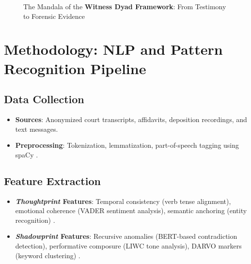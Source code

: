 \documentclass[11pt]{article}
\newcommand{\thoughtprint}{\textit{Thoughtprint}}
\newcommand{\shadowprint}{\textit{Shadowprint}}
\newcommand{\witnessdyad}{\textbf{Witness Dyad Framework}}
\newcommand{\metacoherence}{\textit{Meta-Coherence}}
\begin{document}
\begin{figure}[htbp]
    \centering
    \caption{The Mandala of the \witnessdyad{}: From Testimony to Forensic Evidence}
    \label{fig:mandala}
\end{figure}

\section{Methodology: NLP and Pattern Recognition Pipeline}
\label{sec:methodology}
\subsection{Data Collection}
\begin{itemize}
    \item \textbf{Sources}: Anonymized court transcripts, affidavits, deposition recordings, and text messages.
    \item \textbf{Preprocessing}: Tokenization, lemmatization, part-of-speech tagging using spaCy \citep{bird2009}.
\end{itemize}

\subsection{Feature Extraction}
\begin{itemize}
    \item \textbf{\thoughtprint{} Features}: Temporal consistency (verb tense alignment), emotional coherence (VADER sentiment analysis), semantic anchoring (entity recognition) \citep{hutto2014}.
    \item \textbf{\shadowprint{} Features}: Recursive anomalies (BERT-based contradiction detection), performative composure (LIWC tone analysis), DARVO markers (keyword clustering) \citep{devlin2019,pennebaker2003}.
\end{itemize}
\end{document}
